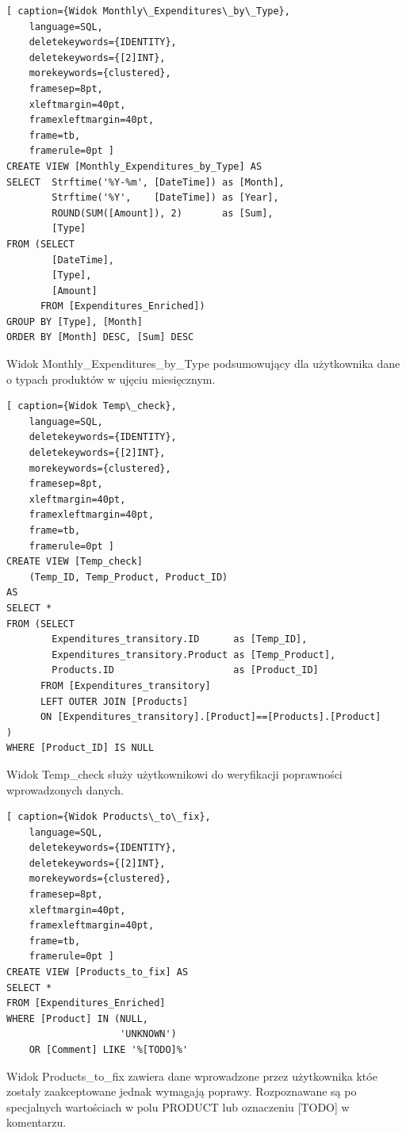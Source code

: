 \documentclass[a4paper,10pt]{report}
\begin{document}
\begin{minipage}{\textwidth}
\begin{lstlisting}[ caption={Widok Monthly\_Expenditures\_by\_Type},
    language=SQL,
    deletekeywords={IDENTITY},
    deletekeywords={[2]INT},
    morekeywords={clustered},
    framesep=8pt,
    xleftmargin=40pt,
    framexleftmargin=40pt,
    frame=tb,
    framerule=0pt ]
CREATE VIEW [Monthly_Expenditures_by_Type] AS 
SELECT	Strftime('%Y-%m', [DateTime]) as [Month],
        Strftime('%Y',    [DateTime]) as [Year],
        ROUND(SUM([Amount]), 2)       as [Sum],
        [Type]
FROM (SELECT 
        [DateTime], 
        [Type], 
        [Amount] 
      FROM [Expenditures_Enriched])
GROUP BY [Type], [Month]
ORDER BY [Month] DESC, [Sum] DESC
\end{lstlisting}
{Widok Monthly\_Expenditures\_by\_Type podsumowujący dla użytkownika dane o 
typach produktów w ujęciu miesięcznym.}
\end{minipage}

\begin{minipage}{\textwidth}
\begin{lstlisting}[ caption={Widok Temp\_check},
    language=SQL,
    deletekeywords={IDENTITY},
    deletekeywords={[2]INT},
    morekeywords={clustered},
    framesep=8pt,
    xleftmargin=40pt,
    framexleftmargin=40pt,
    frame=tb,
    framerule=0pt ]
CREATE VIEW [Temp_check] 
    (Temp_ID, Temp_Product, Product_ID)
AS
SELECT *
FROM (SELECT 
        Expenditures_transitory.ID      as [Temp_ID],
        Expenditures_transitory.Product as [Temp_Product],
        Products.ID                     as [Product_ID]
      FROM [Expenditures_transitory]
      LEFT OUTER JOIN [Products]
      ON [Expenditures_transitory].[Product]==[Products].[Product]
)
WHERE [Product_ID] IS NULL
\end{lstlisting}
{Widok Temp\_check służy użytkownikowi do weryfikacji poprawności wprowadzonych 
danych.}
\end{minipage}

\begin{minipage}{\textwidth}
\begin{lstlisting}[ caption={Widok Products\_to\_fix},
    language=SQL,
    deletekeywords={IDENTITY},
    deletekeywords={[2]INT},
    morekeywords={clustered},
    framesep=8pt,
    xleftmargin=40pt,
    framexleftmargin=40pt,
    frame=tb,
    framerule=0pt ]
CREATE VIEW [Products_to_fix] AS
SELECT *
FROM [Expenditures_Enriched]
WHERE [Product] IN (NULL,
                    'UNKNOWN')
    OR [Comment] LIKE '%[TODO]%'
\end{lstlisting}
{Widok Products\_to\_fix zawiera dane wprowadzone przez użytkownika któe 
zostały zaakceptowane jednak wymagają poprawy. Rozpoznawane są po specjalnych
 wartościach w polu PRODUCT lub oznaczeniu [TODO] w komentarzu.}
\end{minipage}
\end{document}
